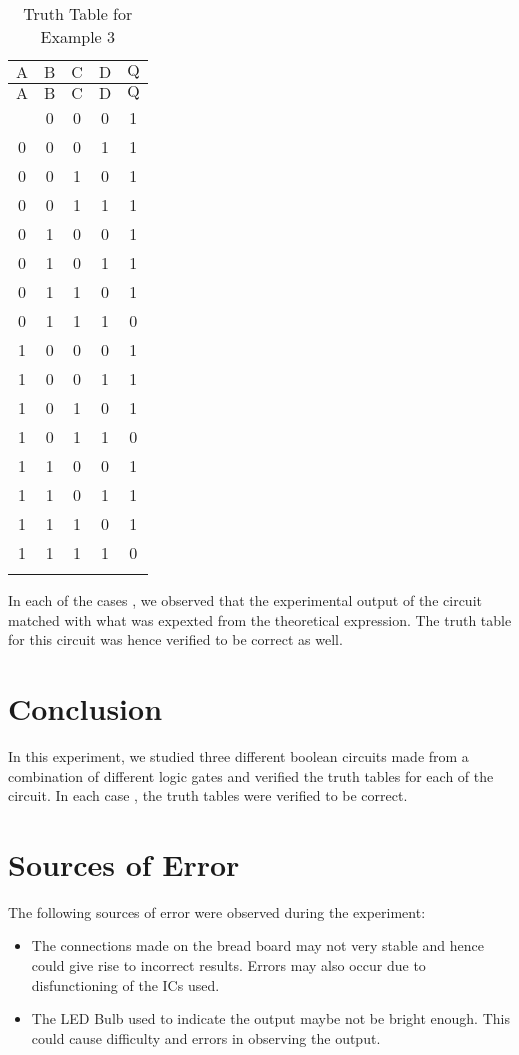 \documentclass[12pt]{article}
\begin{document}
\begin{longtable}{|c|c|c|c||c|}
	\hline
    $\mathrm{A}$  & $\mathrm{B}$ & $\mathrm{C}$ & $\mathrm{D}$ & $\mathrm{Q}$ \\
  \hline
	\endfirsthead
	\hline
   $\mathrm{A}$  & $\mathrm{B}$ & $\mathrm{C}$ & $\mathrm{D}$ & $\mathrm{Q}$ \\ \hline
	\endhead
	\hline
	\endfoot
	
  \endlastfoot
  0 & 0 & 0 & 0 & 1 \\ \hline
    0 & 0 & 0 & 1 & 1 \\ \hline
    0 & 0 & 1 & 0 & 1 \\ \hline
    0 & 0 & 1 & 1 & 1 \\ \hline
    0 & 1 & 0 & 0 & 1 \\ \hline
    0 & 1 & 0 & 1 & 1 \\ \hline
    0 & 1 & 1 & 0 & 1 \\ \hline
    0 & 1 & 1 & 1 & 0 \\ \hline
    1 & 0 & 0 & 0 & 1 \\ \hline
    1 & 0 & 0 & 1 & 1 \\ \hline
    1 & 0 & 1 & 0 & 1 \\ \hline
    1 & 0 & 1 & 1 & 0 \\ \hline
    1 & 1 & 0 & 0 & 1 \\ \hline
    1 & 1 & 0 & 1 & 1 \\ \hline
    1 & 1 & 1 & 0 & 1 \\ \hline
    1 & 1 & 1 & 1 & 0 \\ \hline
  \caption{Truth Table for Example 3}
  \end{longtable}
\noindent
In each of the cases , we observed that the experimental output of the circuit matched with what was expexted from the theoretical expression. The truth table for this circuit was hence verified to be correct as well.

\section{Conclusion}
In this experiment, we studied three different boolean circuits made from a combination of different logic gates and verified the truth tables for each of the circuit. In each case , the truth tables were verified to be correct.

\section{Sources of Error}
The following sources of error were observed during the experiment:
\begin{itemize}
  \item The connections made on the bread board may not very stable and hence could give rise to incorrect results. Errors may also occur due to disfunctioning of the ICs used.
  \item The LED Bulb used to indicate the output maybe not be bright enough. This could cause difficulty and errors in observing the output.
\end{itemize}
\end{document}
